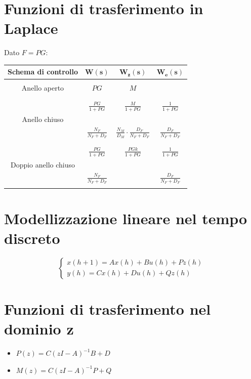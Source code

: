 \documentclass{report}
\theoremstyle{nostyle}
\begin{document}
\section{Funzioni di trasferimento in Laplace}
Dato $F = PG$:\\
\begin{center}
\begin{tabular}{c||c|c|c}
    \textbf{Schema di controllo} & $\displaystyle \bm{W(s)}$ & $\displaystyle \bm{W_z(s)}$  & $\displaystyle \bm{W_e(s)} $ \\
    \hline
    \hline
    & & & \\
    Anello aperto & $\displaystyle PG$ & $\displaystyle M$ & \\
    & & & \\
    \hline
    &&&\\
     & $\displaystyle \frac{PG}{1+PG}$ & $\displaystyle \frac{M}{1+PG}  $  & $\displaystyle \frac{1}{1 + PG}  $\\
    Anello chiuso&&&\\
    & $\displaystyle  \frac{N_F}{N_F + D_F}$ & $\displaystyle \frac{N_M}{D_M} \cdot \frac{D_F}{N_F+D_F}  $ & $\displaystyle  \frac{D_F}{N_F +D_F }$  \\
    &&&\\
    \hline
    &&&\\
     & $\displaystyle \frac{PG}{1+PG}$ & $\displaystyle \frac{PGk}{1+PG}  $  & $\displaystyle \frac{1}{1 + PG}  $\\
    Doppio anello chiuso&&&\\
    & $\displaystyle  \frac{N_F}{N_F + D_F}$ &  & $\displaystyle  \frac{D_F}{N_F +D_F }$  \\
    &&&\\
\end{tabular}
\end{center}

\section{Modellizzazione lineare nel tempo discreto}
\[      \begin{cases}
    x(h+1) = Ax(h) + Bu(h) + Pz(h) \\
    y(h) = Cx(h) + D u (h) + Q z(h)
\end{cases}    \]
\section{Funzioni di trasferimento nel dominio z}
\begin{itemize}
    \item $P(z) = C(zI-A)^{-1}B + D$
    \item $M(z) = C(zI-A)^{-1}P+Q$
\end{itemize}
\end{document}
